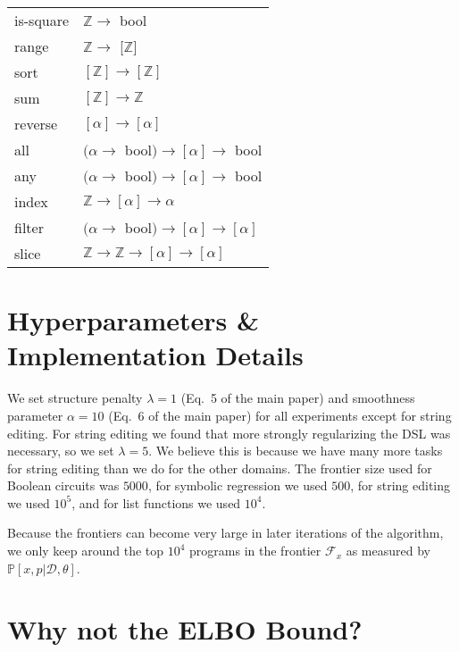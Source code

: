 \documentclass{article}
\newcommand{\probability}{\mathds{P}} %
\begin{document}
\begin{center}
\begin{tabular}{| l | l |}
    is-square & $\mathbb{Z} \to$ bool \\
    range & $\mathbb{Z} \to$ [$\mathbb{Z}$] \\
    sort & $\left[\mathbb{Z}\right] \to \left[\mathbb{Z}\right]$ \\
    \hline
    sum & $\left[\mathbb{Z}\right] \to \mathbb{Z}$ \\
    reverse & $\left[\alpha\right] \to \left[\alpha\right]$ \\
    all & $(\alpha \to$ bool$) \to \left[\alpha\right] \to$ bool \\
    any & $(\alpha \to$ bool$) \to \left[\alpha\right] \to$ bool \\
    index & $\mathbb{Z} \to \left[\alpha\right] \to \alpha$ \\
    filter & $(\alpha \to$ bool$) \to \left[\alpha\right] \to \left[\alpha\right]$ \\
    slice & $\mathbb{Z} \to \mathbb{Z} \to \left[\alpha\right] \to \left[\alpha\right]$ \\
  \hline
\end{tabular}
\end{center}

\vfill

\section{Hyperparameters \& Implementation Details}
We set structure penalty $\lambda = 1$ (Eq.~5 of the main paper) and
smoothness parameter $\alpha = 10$ (Eq.~6 of the main paper)
for all experiments except for string editing.
For string editing we found that more strongly regularizing
the DSL was necessary,
so we set $\lambda = 5$.
We believe this is because
we have many more tasks for string editing than we do for the other domains.
The frontier size used for Boolean circuits was $5000$,
for symbolic regression we used $500$,
for string editing we used $10^5$,
and for list functions we used $10^4$.



Because the frontiers can become very large in later iterations of the algorithm,
we only keep around the top $10^4$ programs in the frontier $\mathcal{F}_x$ as measured by $\probability[x,p|\mathcal{D},\theta]$.




\section{Why not the ELBO Bound?}
\end{document}
